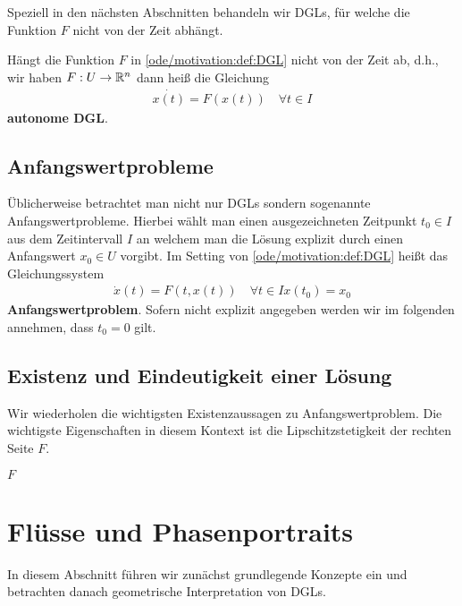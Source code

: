 Speziell in den nächsten Abschnitten behandeln wir DGLs, für welche die Funktion \(F\) nicht von der Zeit abhängt.
\label{ode/motivation:definition-1}
\begin{definition}{}{}



Hängt die Funktion \(F\) in \cref{ode/motivation:def:DGL}  nicht von der Zeit ab, d.h., wir haben \(F:U\rightarrow\mathbb{R}^n\) dann heiß die Gleichung
\begin{align}\label{equation:ode/motivation:eq:DGL}
\dot{x(t)} = F(x(t))\quad\forall t\in I
\end{align}
\textbf{autonome DGL}.
\end{definition}


\subsection{Anfangswertprobleme}
\label{\detokenize{ode/motivation:anfangswertprobleme}}
Üblicherweise betrachtet man nicht nur DGLs sondern sogenannte Anfangswertprobleme. Hierbei wählt man einen ausgezeichneten Zeitpunkt \(t_0\in I\) aus dem Zeitintervall \(I\) an welchem man die Lösung explizit durch einen Anfangswert \(x_0\in U\) vorgibt. Im Setting von \cref{ode/motivation:def:DGL}  heißt
das Gleichungssystem
\begin{align}\label{equation:ode/motivation:eq:AWP}
\dot{x}(t) = F(t, x(t))\quad\forall t\in I
x(t_0) = x_0
\end{align}
\textbf{Anfangswertproblem}. Sofern nicht explizit angegeben werden wir im folgenden annehmen, dass \(t_0=0\) gilt.


\subsection{Existenz und Eindeutigkeit einer Lösung}
\label{\detokenize{ode/motivation:existenz-und-eindeutigkeit-einer-losung}}
Wir wiederholen die wichtigsten Existenzaussagen zu Anfangswertproblem. Die wichtigste Eigenschaften in diesem Kontext ist die Lipschitzstetigkeit der rechten Seite \(F\).
\label{ode/motivation:definition-2}
\begin{definition}{}{}



\(F\)
\end{definition}


\section{Flüsse und Phasenportraits}
\label{\detokenize{ode/fluesse:flusse-und-phasenportraits}}\label{\detokenize{ode/fluesse::doc}}
In diesem Abschnitt führen wir zunächst grundlegende Konzepte ein und betrachten danach geometrische Interpretation von DGLs.

